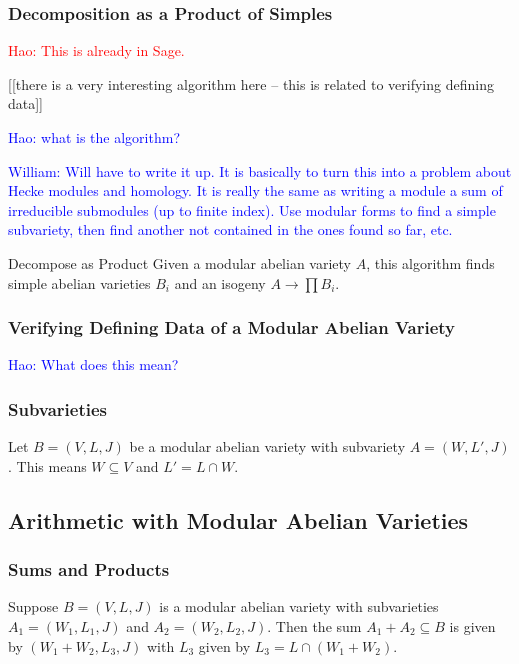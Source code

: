 \documentclass{article}
\newcommand{\Hao}[1]{\textcolor{blue}{\textsf{Hao: #1}}}
\newcommand{\wstein}[1]{\textcolor{blue}{\textsf{William: #1}}}
\newcommand{\Haonew}[1]{\textcolor{red}{\textsf{Hao: #1}}}
\begin{document}
\subsubsection{Decomposition as a Product of Simples}



\Haonew{This is already in Sage.}

[[there is a very interesting algorithm here -- this is related
to verifying defining data]]

\Hao{what is the algorithm?}

\wstein{Will have to write it up.  It is basically to turn this into a problem about Hecke modules and homology.  It is really the same as
writing a module a sum of irreducible submodules (up to finite index).
Use modular forms to find a simple subvariety, then find another not
contained in the ones found so far, etc.}


\begin{algorithm}{Decompose as Product}
Given a modular abelian variety $A$,
this algorithm finds simple abelian varieties
$B_i$ and an isogeny $A\to \prod B_i$.
\end{algorithm}



\subsubsection{Verifying Defining Data of a Modular Abelian Variety}

\Hao{What does this mean?}



\subsubsection{Subvarieties}

Let $B=(V, L, J)$ be a modular abelian variety with subvariety $A=(W, L', J)$.
This means $W\subseteq V$ and $L' = L\cap W$.

\subsection{Arithmetic with Modular Abelian Varieties}

\subsubsection{Sums and Products}

Suppose $B=(V, L, J)$ is a modular abelian variety with subvarieties $A_1=(W_1,
L_1, J)$ and $A_2=(W_2, L_2, J)$. Then the sum $A_1+A_2\subseteq B$ is given by
$(W_1+W_2, L_3, J)$ with $L_3$ given by $L_3 = L\cap (W_1+W_2)$.
\end{document}
